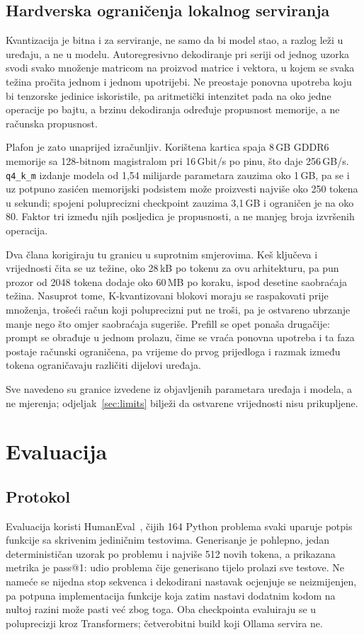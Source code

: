 \documentclass[10pt,conference,a4paper]{IEEEtran}
\begin{document}
\subsection{Hardverska ograničenja lokalnog serviranja}
\label{sec:hw}
Kvantizacija je bitna i za serviranje, ne samo da bi model stao, a razlog leži
u uređaju, a ne u modelu. Autoregresivno dekodiranje pri seriji od jednog
uzorka svodi svako množenje matricom na proizvod matrice i vektora, u kojem
se svaka težina pročita jednom i jednom upotrijebi. Ne preostaje ponovna
upotreba koju bi tenzorske jedinice iskoristile, pa aritmetički intenzitet
pada na oko jedne operacije po bajtu, a brzinu dekodiranja određuje propusnost
memorije, a ne računska propusnost.

Plafon je zato unaprijed izračunljiv. Korištena kartica spaja 8\,GB GDDR6
memorije sa 128-bitnom magistralom pri 16\,Gbit/s po pinu, što daje
256\,GB/s. \texttt{q4\_k\_m} izdanje modela od 1,54 milijarde parametara
zauzima oko 1\,GB, pa se i uz potpuno zasićen memorijski podsistem može
proizvesti najviše oko 250 tokena u sekundi; spojeni poluprecizni checkpoint
zauzima 3,1\,GB i ograničen je na oko 80. Faktor tri između njih posljedica je
propusnosti, a ne manjeg broja izvršenih operacija.

Dva člana korigiraju tu granicu u suprotnim smjerovima. Keš ključeva i
vrijednosti čita se uz težine, oko 28\,kB po tokenu za ovu arhitekturu, pa
pun prozor od 2048 tokena dodaje oko 60\,MB po koraku, ispod desetine
saobraćaja težina. Nasuprot tome, K-kvantizovani blokovi moraju se raspakovati
prije množenja, trošeći račun koji poluprecizni put ne troši, pa je ostvareno
ubrzanje manje nego što omjer saobraćaja sugeriše. Prefill se opet ponaša
drugačije: prompt se obrađuje u jednom prolazu, čime se vraća ponovna
upotreba i ta faza postaje računski ograničena, pa vrijeme do prvog prijedloga
i razmak između tokena ograničavaju različiti dijelovi uređaja.

Sve navedeno su granice izvedene iz objavljenih parametara uređaja i modela, a
ne mjerenja; odjeljak~\ref{sec:limits} bilježi da ostvarene vrijednosti nisu
prikupljene.

\section{Evaluacija}
\subsection{Protokol}
Evaluacija koristi HumanEval~\cite{chen2021humaneval}, čijih 164 Python problema svaki uparuje potpis
funkcije sa skrivenim jediničnim testovima. Generisanje je pohlepno, jedan
determinističan uzorak po problemu i najviše 512 novih tokena, a prikazana
metrika je pass@1: udio problema čije generisano tijelo prolazi sve testove.
Ne nameće se nijedna stop sekvenca i dekodirani nastavak ocjenjuje se
neizmijenjen, pa potpuna implementacija funkcije koja zatim nastavi dodatnim
kodom na nultoj razini može pasti već zbog toga. Oba checkpointa evaluiraju se
u poluprecizji kroz Transformers; četverobitni build koji Ollama servira ne.
\end{document}
